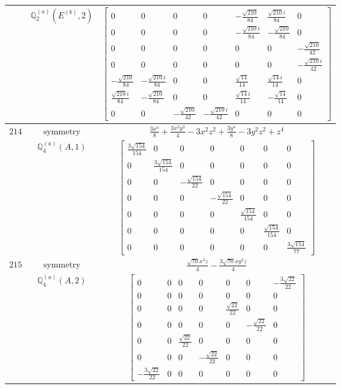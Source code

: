 \documentclass[fleqn,8pt,landscape]{jsarticle}
\begin{document}
\begin{longtable}{ccc}
$  $ & $ \mathbb{Q}_{2}^{(a)}(E^{(b)},2) $ & $ \begin{bmatrix} 0 & 0 & 0 & 0 & - \frac{\sqrt{210}}{84} & \frac{\sqrt{210} i}{84} & 0 \\ 0 & 0 & 0 & 0 & - \frac{\sqrt{210} i}{84} & - \frac{\sqrt{210}}{84} & 0 \\ 0 & 0 & 0 & 0 & 0 & 0 & - \frac{\sqrt{210}}{42} \\ 0 & 0 & 0 & 0 & 0 & 0 & - \frac{\sqrt{210} i}{42} \\ - \frac{\sqrt{210}}{84} & - \frac{\sqrt{210} i}{84} & 0 & 0 & \frac{\sqrt{14}}{14} & \frac{\sqrt{14} i}{14} & 0 \\ \frac{\sqrt{210} i}{84} & - \frac{\sqrt{210}}{84} & 0 & 0 & \frac{\sqrt{14} i}{14} & - \frac{\sqrt{14}}{14} & 0 \\ 0 & 0 & - \frac{\sqrt{210}}{42} & - \frac{\sqrt{210} i}{42} & 0 & 0 & 0 \end{bmatrix} $ \\ \hline
$ 214 $ & $ \text{symmetry} $ & $ \frac{3 x^{4}}{8} + \frac{3 x^{2} y^{2}}{4} - 3 x^{2} z^{2} + \frac{3 y^{4}}{8} - 3 y^{2} z^{2} + z^{4} $ \\
$  $ & $ \mathbb{Q}_{4}^{(a)}(A,1) $ & $ \begin{bmatrix} \frac{3 \sqrt{154}}{154} & 0 & 0 & 0 & 0 & 0 & 0 \\ 0 & \frac{3 \sqrt{154}}{154} & 0 & 0 & 0 & 0 & 0 \\ 0 & 0 & - \frac{\sqrt{154}}{22} & 0 & 0 & 0 & 0 \\ 0 & 0 & 0 & - \frac{\sqrt{154}}{22} & 0 & 0 & 0 \\ 0 & 0 & 0 & 0 & \frac{\sqrt{154}}{154} & 0 & 0 \\ 0 & 0 & 0 & 0 & 0 & \frac{\sqrt{154}}{154} & 0 \\ 0 & 0 & 0 & 0 & 0 & 0 & \frac{3 \sqrt{154}}{77} \end{bmatrix} $ \\ \hline
$ 215 $ & $ \text{symmetry} $ & $ \frac{\sqrt{70} x^{3} z}{4} - \frac{3 \sqrt{70} x y^{2} z}{4} $ \\
$  $ & $ \mathbb{Q}_{4}^{(a)}(A,2) $ & $ \begin{bmatrix} 0 & 0 & 0 & 0 & 0 & 0 & - \frac{3 \sqrt{22}}{22} \\ 0 & 0 & 0 & 0 & 0 & 0 & 0 \\ 0 & 0 & 0 & 0 & \frac{\sqrt{22}}{22} & 0 & 0 \\ 0 & 0 & 0 & 0 & 0 & - \frac{\sqrt{22}}{22} & 0 \\ 0 & 0 & \frac{\sqrt{22}}{22} & 0 & 0 & 0 & 0 \\ 0 & 0 & 0 & - \frac{\sqrt{22}}{22} & 0 & 0 & 0 \\ - \frac{3 \sqrt{22}}{22} & 0 & 0 & 0 & 0 & 0 & 0 \end{bmatrix} $ \\ \hline

\end{longtable}
\end{document}
